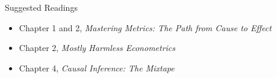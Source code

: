 \documentclass[hyperref={pdfpagelabels=false}]{beamer}
\begin{document}
	\begin{frame}{Suggested Readings}
		\begin{itemize}
			\item Chapter 1 and 2, \textit{Mastering Metrics: The Path from Cause to Effect}
			\vspace{0.2cm}
			\item Chapter 2, \textit{Mostly Harmless Econometrics}
			\vspace{0.2cm}
			\item Chapter 4, \textit{Causal Inference: The Mixtape}
		\end{itemize}
	\end{frame}
	
\end{document}
